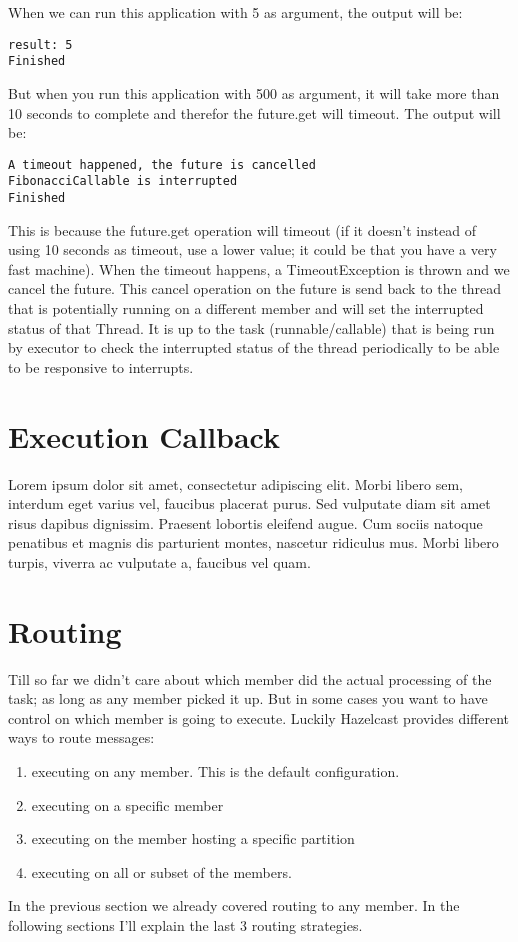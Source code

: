 When we can run this application with 5 as argument, the output will be: 
\begin{lstlisting}
result: 5
Finished
\end{lstlisting}
But when you run this application with 500 as argument, it will take more than 10 seconds to complete and therefor the future.get will timeout. The output will be:
\begin{lstlisting}
A timeout happened, the future is cancelled
FibonacciCallable is interrupted
Finished
\end{lstlisting}
This is because the future.get operation will timeout (if it doesn't instead of using 10 seconds as timeout, use a lower value; it could be that you have a very fast machine). When the timeout happens, a TimeoutException is thrown and we cancel the future. This cancel operation on the future is send back to the thread that is potentially running on a different member and will set the interrupted status of that Thread. It is up to the task (runnable/callable) that is being run by executor to check the interrupted status of the thread periodically to be able to be responsive to interrupts.

\section{Execution Callback}
Lorem ipsum dolor sit amet, consectetur adipiscing elit. Morbi libero sem,
interdum eget varius vel, faucibus placerat purus. Sed vulputate diam sit amet
risus dapibus dignissim. Praesent lobortis eleifend augue. Cum sociis natoque
penatibus et magnis dis parturient montes, nascetur ridiculus mus. Morbi libero
turpis, viverra ac vulputate a, faucibus vel quam.

\section{Routing}
Till so far we didn't care about which member did the actual processing of the task; as long as any member picked it up. But in some cases you want to have control on which member is going to execute. Luckily Hazelcast provides different ways to route messages:
\begin{enumerate}
\item executing on any member. This is the default configuration.
\item executing on a specific member
\item executing on the member hosting a specific partition
\item executing on all or subset of the members.
\end{enumerate}
In the previous section we already covered routing to any member. In the following sections I'll explain the last 3 routing strategies.

